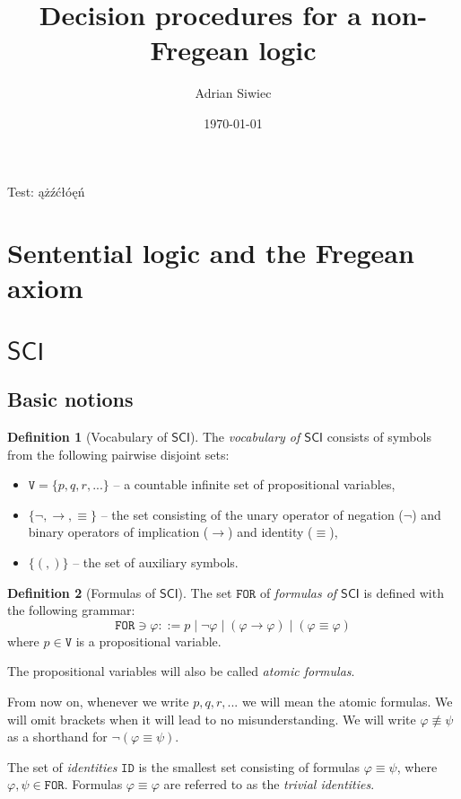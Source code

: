 \documentclass{article}
\title{Decision procedures for a non-Fregean logic \SCI}
\author{Adrian Siwiec}
\theoremstyle{definition}
\newtheorem{definition}{Definition}[section]
\theoremstyle{definition}
\theoremstyle{definition}
\theoremstyle{definition}
\theoremstyle{definition}
\newcommand*{\id}{\equiv}
\newcommand*{\ra}{\rightarrow}
\newcommand*{\V}{\texttt{V}}
\newcommand*{\FOR}{\texttt{FOR}}
\newcommand*{\ID}{\texttt{ID}}
\newcommand{\SCI}{$\mathsf{SCI}$\xspace}
\begin{document}
\date{\today}

\maketitle

Test: ążźćłóęń

\section{Sentential logic and the Fregean axiom}
\section{\SCI}
\subsection{Basic notions}

\begin{definition}[Vocabulary of \SCI]
    The \emph{vocabulary of \SCI} consists of symbols from the following pairwise disjoint sets:
    \begin{itemize}
        \item $\V = \{p, q, r, ...\}$ -- a countable infinite set of propositional variables,
        \item $\{\lnot, \ra, \id \}$  -- the set consisting of the unary operator of negation ($\lnot$) and binary operators of implication ($\ra$) and identity ($\id$),
        \item $\{(,)\}$ -- the set of auxiliary symbols.
    \end{itemize}
\end{definition}
\begin{definition}[Formulas of \SCI]
    The set $\FOR$ of \emph{formulas of \SCI} is defined with the following grammar:
    $$
        \FOR \ni \varphi ::= p  \; | \;  \lnot \varphi \; | \; (\varphi \ra \varphi) \; | \; (\varphi \id \varphi)
    $$ where $p \in \V$ is a propositional variable.
\end{definition}
The propositional variables will also be called \emph{atomic formulas}.

From now on, whenever we write $p, q, r, ... $ we will mean the atomic
formulas. We will omit brackets when it will lead to no misunderstanding. We
will write $\varphi \not \id \psi$ as a shorthand for $\lnot(\varphi \id
    \psi)$.

The set of \emph{identities} $\ID$ is the smallest set consisting of formulas
$\varphi \id \psi$, where $\varphi, \psi \in \FOR$. Formulas $\varphi \id
    \varphi$ are referred to as the \emph{trivial identities}.
\end{document}
